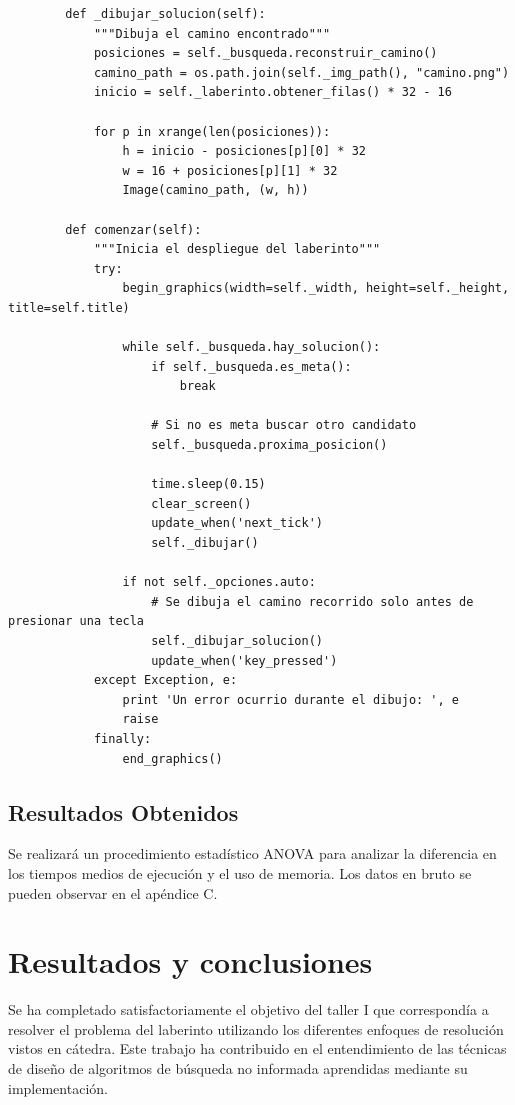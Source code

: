 \documentclass[letter, titlepage, 10pt]{article}
\begin{document}
\begin{lstlisting}
        def _dibujar_solucion(self):
            """Dibuja el camino encontrado"""
            posiciones = self._busqueda.reconstruir_camino()
            camino_path = os.path.join(self._img_path(), "camino.png")
            inicio = self._laberinto.obtener_filas() * 32 - 16
            
            for p in xrange(len(posiciones)):
                h = inicio - posiciones[p][0] * 32
                w = 16 + posiciones[p][1] * 32
                Image(camino_path, (w, h))
        
        def comenzar(self):
            """Inicia el despliegue del laberinto"""
            try:
                begin_graphics(width=self._width, height=self._height, title=self.title)
                
                while self._busqueda.hay_solucion():
                    if self._busqueda.es_meta():
                        break
                    
                    # Si no es meta buscar otro candidato
                    self._busqueda.proxima_posicion()
                    
                    time.sleep(0.15)
                    clear_screen()
                    update_when('next_tick')
                    self._dibujar()
                
                if not self._opciones.auto:
                    # Se dibuja el camino recorrido solo antes de presionar una tecla
                    self._dibujar_solucion()
                    update_when('key_pressed')
            except Exception, e:
                print 'Un error ocurrio durante el dibujo: ', e
                raise
            finally:
                end_graphics()
\end{lstlisting}

\subsection{Resultados Obtenidos}
Se realizará un procedimiento estadístico ANOVA para analizar la diferencia en los tiempos medios de ejecución y el uso de memoria. Los datos en bruto se pueden observar en el apéndice C.

\newpage
\section{Resultados y conclusiones}
Se ha completado satisfactoriamente el objetivo del taller I que correspondía a resolver el problema del laberinto utilizando los diferentes enfoques de resolución vistos en cátedra. Este trabajo ha contribuido en el entendimiento de las técnicas de diseño de algoritmos de búsqueda no informada aprendidas mediante su implementación.
\end{document}
